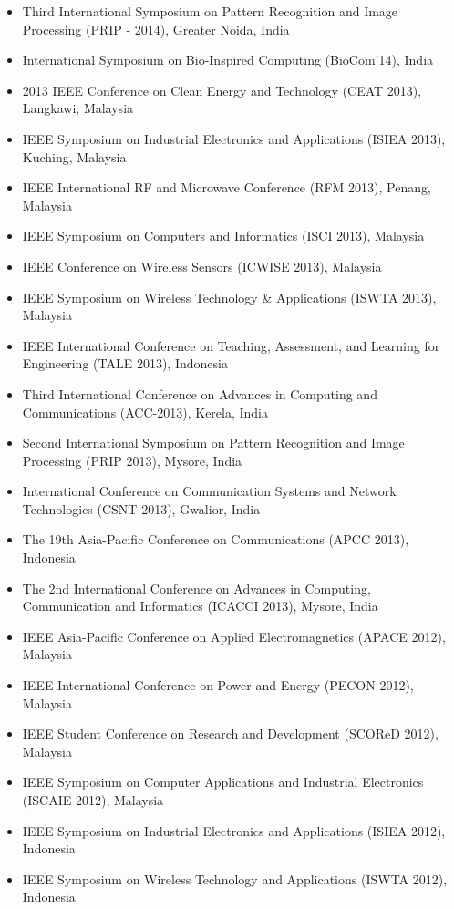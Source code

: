 \documentclass[11pt,a4paper,sans]{moderncv}   %
\begin{document}
\begin{itemize}
\item Third International Symposium on Pattern Recognition and Image Processing (PRIP - 2014), Greater Noida, India
\item International Symposium on Bio-Inspired Computing (BioCom'14), India
\item 2013 IEEE Conference on Clean Energy and Technology (CEAT 2013), Langkawi, Malaysia
\item IEEE Symposium on Industrial Electronics and Applications (ISIEA 2013), Kuching, Malaysia 
\item IEEE International RF and Microwave Conference (RFM 2013), Penang, Malaysia
\item IEEE Symposium on Computers and Informatics (ISCI 2013), Malaysia
\item IEEE Conference on Wireless Sensors (ICWISE 2013), Malaysia
\item IEEE Symposium on Wireless Technology \& Applications (ISWTA 2013), Malaysia 
\item IEEE International Conference on Teaching, Assessment, and Learning for Engineering (TALE 2013), Indonesia
\item Third International Conference on Advances in Computing and Communications (ACC-2013), Kerela, India 
\item Second International Symposium on Pattern Recognition and Image Processing (PRIP 2013), Mysore, India
\item International Conference on Communication Systems and Network Technologies (CSNT 2013), Gwalior, India
\item The 19th Asia-Pacific Conference on Communications (APCC 2013), Indonesia
\item The 2nd International Conference on Advances in Computing, Communication and Informatics (ICACCI 2013), Mysore, India
\item	IEEE Asia-Pacific Conference on Applied Electromagnetics (APACE 2012), Malaysia
\item	IEEE International Conference on Power and Energy (PECON 2012), Malaysia
\item	IEEE Student Conference on Research and Development (SCOReD 2012), Malaysia
\item	IEEE Symposium on Computer Applications and Industrial Electronics (ISCAIE 2012), Malaysia
\item	IEEE Symposium on Industrial Electronics and Applications (ISIEA 2012), Indonesia
\item	IEEE Symposium on Wireless Technology and Applications (ISWTA 2012), Indonesia

\end{itemize}
\end{document}
